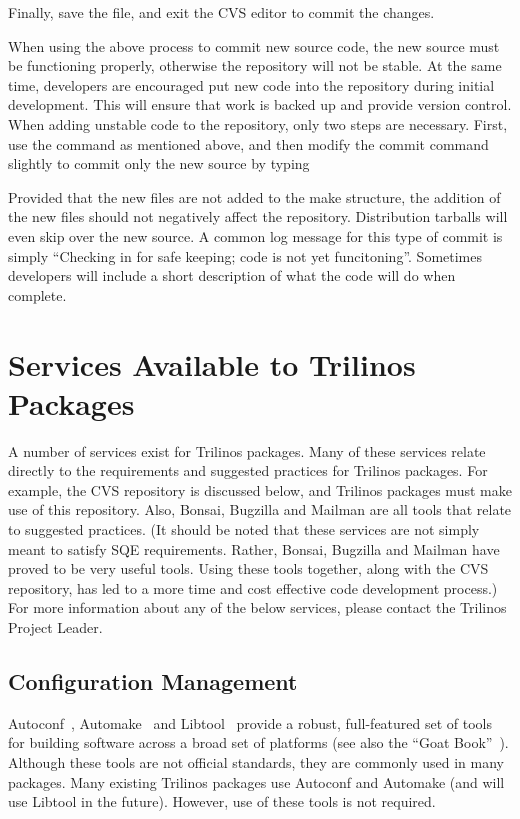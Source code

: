 \documentclass[12pt,relax]{TrilinosDevGuide}
\begin{document}
\begin{enumerate}
Finally, save the file, and exit the CVS editor to commit the changes.

When using the above process to commit new source code, the new source must 
be functioning properly, otherwise the repository will not be stable.  
At the same time, developers are encouraged put new code into the repository 
during initial development.  This will ensure that work is backed up and 
provide version control.  When adding unstable code to the repository, only
two steps are necessary.  First, use the  command as 
mentioned above, and then modify the commit command slightly to commit only 
the new source by typing


Provided that the new files are not added to the make structure, the addition 
of the new files should not negatively affect the repository.  Distribution 
tarballs will even skip over the new source.  A common log message for this 
type of commit is simply ``Checking in for safe keeping; code is not yet 
funcitoning''.  Sometimes developers will include a short description of what 
the code will do when complete.
\end{enumerate}

\section{Services Available to Trilinos Packages}
\label{Section:AvailableServices}
A number of services exist for Trilinos packages.  Many of these services 
relate directly to the requirements and suggested practices for Trilinos 
packages.  For example, the CVS repository is discussed below, and 
Trilinos packages must make use of this repository.  Also, Bonsai, Bugzilla 
and Mailman are all tools that relate to suggested practices.  (It should be 
noted that these services are not simply meant to satisfy SQE requirements.  
Rather, Bonsai, Bugzilla and Mailman have proved to be very useful tools.  
Using these tools together, along with the CVS repository, has led to a more 
time and cost effective code development process.)  For more information about 
any of the below services, please contact the Trilinos Project Leader.

\subsection{Configuration Management}
Autoconf~\cite{Autoconf},  Automake~\cite{Automake} and Libtool~\cite{Libtool} 
provide a robust, full-featured set of tools for building software across a 
broad set of platforms (see also the ``Goat Book''~\cite{GoatBook}).  Although 
these tools are not official standards, they are commonly used in many 
packages.  Many existing Trilinos packages use Autoconf and Automake (and will 
use Libtool in the future).  However, use of these tools is not required.
\end{document}
